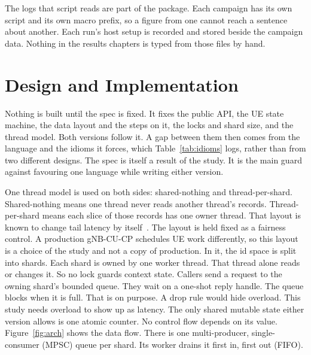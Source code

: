 \documentclass[english,oneside,a4paper,censored,csm,software-track-2020]{HYthesisML}
\begin{document}
The logs that script reads are part of the package. Each campaign has its own
script and its own macro prefix, so a figure from one cannot reach a sentence
about another. Each run's host setup is recorded and stored beside the
campaign data. Nothing in the results chapters is typed from those files by
hand.

\chapter{Design and Implementation\label{chapter:design}}

Nothing is built until the spec is fixed. It fixes the public API, the UE
state machine, the data layout and the steps on it, the locks and shard size,
and the thread model. Both versions follow it. A gap between them then comes
from the language and the idioms it forces, which Table~\ref{tab:idioms} logs,
rather than from two different designs. The spec is itself a result of
the study. It is the main guard against favouring one language while writing either version.

One thread model is used on both sides: shared-nothing and thread-per-shard.
Shared-nothing means one thread never reads another thread’s records. Thread-per-shard means
each slice of those records has one owner thread.
That layout is known to change tail latency by
itself~\cite{enberg2019threadpercore}. The layout is held fixed as a fairness
control. A production gNB-CU-CP schedules UE work differently, so this layout is a choice
of the study and not a copy of production. In it, the id space is split into shards. Each
shard is owned by one worker thread. That thread alone reads or changes it.
So no lock guards context state. Callers send a request to the owning shard's
bounded queue. They wait on a one-shot reply handle. The queue blocks when it
is full. That is on purpose. A drop rule would hide overload. This study needs
overload to show up as latency. The only shared mutable state either version
allows is one atomic counter. No control flow depends on its value.
Figure~\ref{fig:arch} shows the data flow. There is one multi-producer,
single-consumer (MPSC) queue per shard. Its worker drains it first in, first
out (FIFO).
\end{document}
